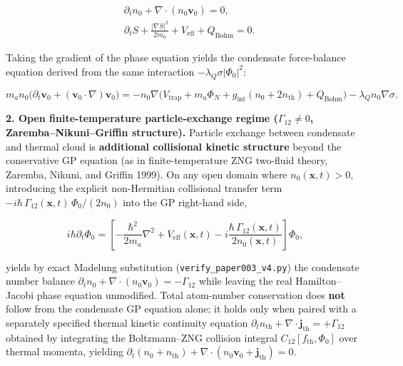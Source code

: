 \documentclass[
  american,
  11pt,
  letterpaper,
]{article}
\begin{document}
\begin{equation}
\begin{aligned}
& \partial_t n_0 + \nabla\cdot(n_0 \mathbf{v}_0) = 0, \\
& \partial_t S + \frac{|\nabla S|^2}{2 m_a} + V_{\mathrm{eff}} + Q_{\mathrm{Bohm}} = 0.
\end{aligned}
\end{equation}

Taking the gradient of the phase equation yields the condensate force-balance equation derived from the same interaction \(-\lambda_Q\sigma|\Phi_0|^2\):

\begin{equation}
m_a n_0 \bigl(\partial_t \mathbf{v}_0 + (\mathbf{v}_0\cdot\nabla)\mathbf{v}_0\bigr)
= -n_0 \nabla\bigl(V_{\mathrm{trap}} + m_a\Phi_N + g_{\mathrm{int}}(n_0 + 2 n_{\mathrm{th}}) + Q_{\mathrm{Bohm}}\bigr) - \lambda_Q n_0 \nabla\sigma.
\end{equation}

\textbf{2. Open finite-temperature particle-exchange regime (\(\Gamma_{12} \neq 0\), Zaremba--Nikuni--Griffin structure).} Particle exchange between condensate and thermal cloud is \textbf{additional collisional kinetic structure} beyond the conservative GP equation (as in finite-temperature ZNG two-fluid theory, Zaremba, Nikuni, and Griffin 1999). On any open domain where \(n_0(\mathbf{x}, t) > 0\), introducing the explicit non-Hermitian collisional transfer term \(-i\hbar\,\Gamma_{12}(\mathbf{x}, t)\,\Phi_0 / (2 n_0)\) into the GP right-hand side,

\begin{equation}
i\hbar \partial_t \Phi_0
= \left[ -\frac{\hbar^2}{2 m_a}\nabla^2 + V_{\mathrm{eff}}(\mathbf{x}, t) - i\frac{\hbar\,\Gamma_{12}(\mathbf{x}, t)}{2 n_0(\mathbf{x}, t)} \right]\Phi_0,
\end{equation}

yields by exact Madelung substitution (\nolinkurl{verify_paper003_v4.py}) the condensate number balance \(\partial_t n_0 + \nabla\cdot(n_0 \mathbf{v}_0) = -\Gamma_{12}\) while leaving the real Hamilton--Jacobi phase equation unmodified. Total atom-number conservation does \textbf{not} follow from the condensate GP equation alone; it holds only when paired with a separately specified thermal kinetic continuity equation \(\partial_t n_{\mathrm{th}} + \nabla\cdot\mathbf{j}_{\mathrm{th}} = +\Gamma_{12}\) obtained by integrating the Boltzmann--ZNG collision integral \(C_{12}[f_{\mathrm{th}}, \Phi_0]\) over thermal momenta, yielding \(\partial_t(n_0 + n_{\mathrm{th}}) + \nabla\cdot(n_0\mathbf{v}_0 + \mathbf{j}_{\mathrm{th}}) = 0\).
\end{document}
